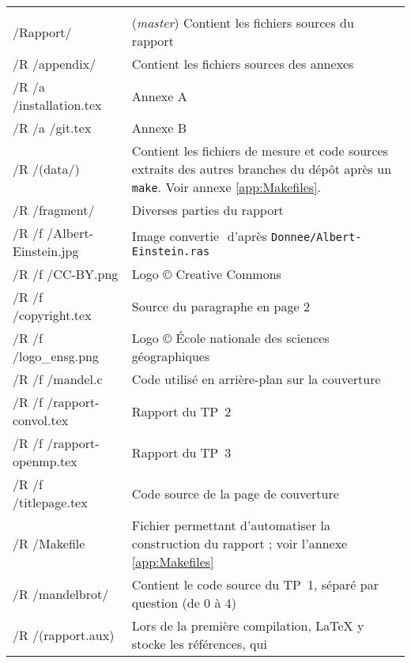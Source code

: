 \begin{onecolumn}
\begin{longtable}{>{\ttfamily}m{} p{}}
                               & \\
    /Rapport/                  & (\emph{master}) Contient les fichiers
                                 sources du rapport\\
    /R /appendix/              & Contient les fichiers sources des
                                 annexes\\
    /R /a /installation.tex    & Annexe A\\
    /R /a /git.tex             & Annexe B\\
    /R /(data/)                & Contient les fichiers de mesure et
                                 code sources extraits des autres
                                 branches du dépôt après un
                                 \texttt{make}. Voir annexe
                                 \ref{app:Makefiles}.\\
    /R /fragment/              & Diverses parties du rapport\\
    /R /f /Albert-Einstein.jpg & Image\,\,convertie\,\,%
                                 d'après
                                 \texttt{Donnee/Albert-Einstein.ras}\\
    /R /f /CC-BY.png           & Logo © Creative Commons\\
    /R /f /copyright.tex       & Source du paragraphe en page 2\\
    /R /f /logo\_ensg.png      & Logo © École nationale des sciences
                                 géographiques\\
    /R /f /mandel.c            & Code utilisé en arrière-plan sur la
                                 couverture\\
    /R /f /rapport-convol.tex  & Rapport du TP~2\\
    /R /f /rapport-openmp.tex  & Rapport du TP~3\\
    /R /f /titlepage.tex       & Code source de la page de
                                 couverture\\
    /R /Makefile               & Fichier permettant d'automatiser la
                                 construction du rapport ; voir
                                 l'annexe \ref{app:Makefiles}\\
    /R /mandelbrot/            & Contient le code source du TP~1,
                                 séparé par question (de 0 à 4)\\
    /R /(rapport.aux)          & Lors de la première compilation,
                                 LaTeX y stocke les références, qui

\end{longtable}
\end{onecolumn}
